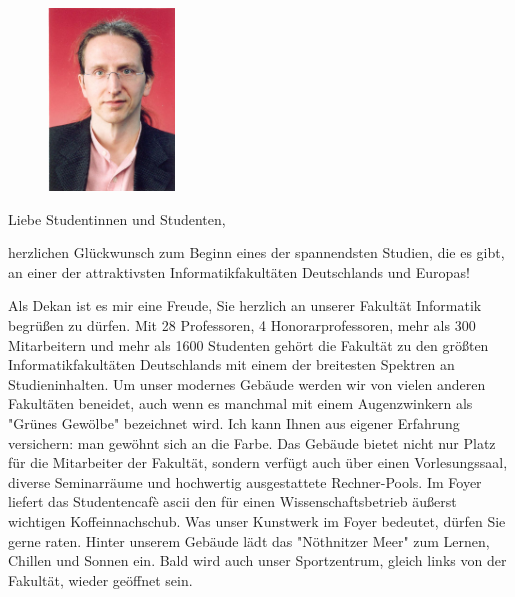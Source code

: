 
\begin{figure}
  \vspace{-15pt}
  \begin{centering}
    \includegraphics[width=0.3\textwidth]{img/franzbaader.jpg}
  \end{centering}
  \vspace{-20pt}
\end{figure}

Liebe Studentinnen und Studenten,

herzlichen Glückwunsch zum Beginn eines der spannendsten Studien, die es gibt, an einer der attraktivsten Informatikfakultäten Deutschlands und Europas!

Als Dekan ist es mir eine Freude, Sie herzlich an unserer Fakultät Informatik begrüßen zu dürfen. Mit 28 Professoren, 4 Honorarprofessoren, mehr als 300 Mitarbeitern und mehr als 1600 Studenten gehört die Fakultät zu den größten Informatikfakultäten Deutschlands mit einem der breitesten Spektren an Studieninhalten. Um unser modernes Gebäude werden wir von vielen anderen Fakultäten beneidet, auch wenn es manchmal mit einem Augenzwinkern als "Grünes Gewölbe" bezeichnet wird. Ich kann Ihnen aus eigener Erfahrung versichern: man gewöhnt sich an die Farbe. Das Gebäude bietet nicht nur Platz für die Mitarbeiter der Fakultät, sondern verfügt auch über einen Vorlesungssaal, diverse Seminarräume und hochwertig ausgestattete Rechner-Pools. Im Foyer liefert das Studentencafè ascii den für einen Wissenschaftsbetrieb äußerst wichtigen Koffeinnachschub. Was unser Kunstwerk im Foyer bedeutet, dürfen Sie gerne raten. Hinter unserem Gebäude lädt das "Nöthnitzer Meer" zum Lernen, Chillen und Sonnen ein. Bald wird auch unser Sportzentrum, gleich links von der Fakultät, wieder geöffnet sein.

